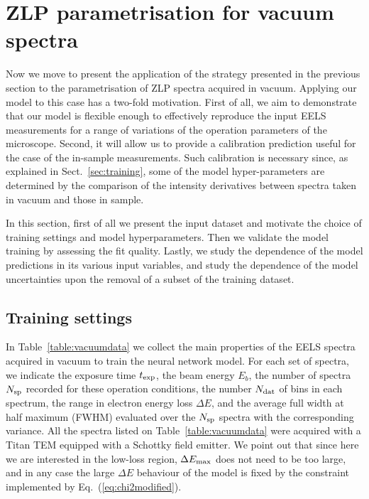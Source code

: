 \section{ZLP parametrisation for vacuum spectra}
\label{sec:results_vacuum}

Now we move to present the application of the strategy presented in the previous
section to the parametrisation of ZLP spectra acquired in vacuum.
%
Applying our model to this case has a two-fold motivation.
%
First of all, we aim to demonstrate that our model is flexible enough to effectively reproduce the
input EELS measurements for a range of variations of the operation parameters of the microscope.
%
Second, it will allow us to provide a calibration prediction
useful for the case of the in-sample measurements.
%
Such calibration is necessary since, as explained in Sect.~\ref{sec:training}, some of the model
hyper-parameters are determined by the comparison of the intensity derivatives
between spectra taken in vacuum and those in sample.

In this section, first of all we present the input dataset and motivate the choice
of training settings and model hyperparameters.
%
Then we validate the model training by assessing the fit quality.
%
Lastly, we study the dependence of the model predictions in its various input
variables, and study the dependence of the model uncertainties upon
the removal of a subset of the training dataset.

\subsection{Training settings}

In Table~\ref{table:vacuumdata} we collect the main properties of the EELS spectra acquired in vacuum to train the neural
    network model.  For each set of spectra, we indicate the exposure time $t_{\rm exp}$, the beam energy
    $E_b$, the number of spectra $N_{\rm sp}$ recorded for these operation conditions, the number $N_{\rm dat}$ of
    bins in each spectrum, the range in electron energy loss $\Delta E$,
    and the average full width at half maximum (FWHM)
    evaluated over the $N_{\rm sp}$ spectra with the corresponding variance.
    All the spectra  listed on Table~\ref{table:vacuumdata}
    were acquired with a Titan TEM equipped with a Schottky field emitter.
    We point out that since here
    we are interested in the low-loss region, $\Delta E_{\rm max}$ does not need
    to be too large, and in any case the large $\Delta E$ behaviour of the model is fixed
    by the constraint implemented by Eq.~(\ref{eq:chi2modified}).

